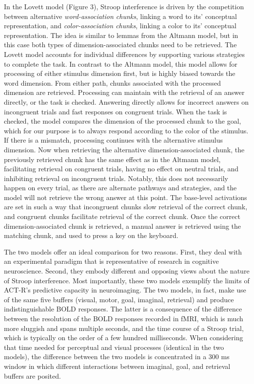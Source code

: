 \documentclass[10pt,letterpaper]{article}
\begin{document}
In the Lovett model (Figure 3), Stroop interference is driven by the competition between alternative \textit{word-association chunks}, linking a word to its' conceptual representation, and \textit{color-association chunks}, linking a color to its' conceptual representation. The idea is similar to lemmas from the Altmann model, but in this case both types of dimension-associated chunks need to be retrieved. The Lovett model accounts for individual differences by supporting various strategies to complete the task. In contrast to the Altmann model, this model allows for processing of either stimulus dimension first, but is highly biased towards the word dimension. From either path, chunks associated with the processed dimension are retrieved. Processing can maintain with the retrieval of an answer directly, or the task is checked. Answering directly allows for incorrect answers on incongruent trials and fast responses on congruent trials. When the task is checked, the model compares the dimension of the processed chunk to the goal, which for our purpose is to always respond according to the color of the stimulus. If there is a mismatch, processing continues with the alternative stimulus dimension. Now when retrieving the alternative dimension-associated chunk, the previously retrieved chunk has the same effect as in the Altmann model, facilitating retrieval on congruent trials, having no effect on neutral trials, and inhibiting retrieval on incongruent trials. Notably, this does not necessarily happen on every trial, as there are alternate pathways and strategies, and the model will not retrieve the wrong answer at this point. The base-level activations are set in such a way that incongruent chunks slow retrieval of the correct chunk, and congruent chunks facilitate retrieval of the correct chunk. Once the correct dimension-associated chunk is retrieved, a manual answer is retrieved using the matching chunk, and used to press a key on the keyboard. 

The two models offer an ideal comparison for two reasons. First, they deal with an experimental paradigm that is representative of research in cognitive neuroscience. Second, they embody different and opposing views about the nature of Stroop interference. Most importantly, these two models exemplify the limits of ACT-R's predictive capacity in neuroimaging. The two models, in fact, make use of the same five buffers (visual, motor, goal, imaginal, retrieval) and produce indistinguishable BOLD responses. The latter is a consequence of the difference between the resolution of the BOLD responses recorded in fMRI, which is much more sluggish and spans multiple seconds, and the time course of a Stroop trial, which is typically on the order of a few hundred milliseconds. When considering that time needed for perceptual and visual processes (identical in the two models), the difference between the two models is concentrated in a 300 ms window in which different interactions between imaginal, goal, and retrieval buffers are posited.
\end{document}
